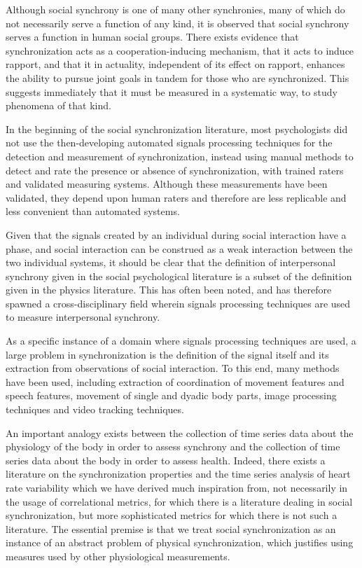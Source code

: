\documentclass[12pt]{article}
\begin{document}
Although social synchrony is one of many other synchronies, many of which do not necessarily serve a function of any kind, it is observed that social synchrony serves a function in human social groups. There exists evidence that synchronization acts as a cooperation-inducing mechanism\cite{coop}, that it acts to induce rapport\cite{rapport}, and that it in actuality, independent of its effect on rapport, enhances the ability to pursue joint goals in tandem for those who are synchronized\cite{goals}. This suggests immediately that it must be measured in a systematic way, to study phenomena of that kind.

In the beginning of the social synchronization literature, most psychologists did not use the then-developing automated signals processing techniques for the detection and measurement of synchronization, instead using manual methods to detect and rate the presence or absence of synchronization, with trained raters and validated measuring systems\cite{manual}. Although these measurements have been validated\cite{manualval}, they depend upon human raters and therefore are less replicable and less convenient than automated systems.

Given that the signals created by an individual during social interaction have a phase, and social interaction can be construed as a weak interaction between the two individual systems, it should be clear that the definition of interpersonal synchrony given in the social psychological literature is a subset of the definition given in the physics literature. This has often been noted\cite{socialsync}, and has therefore spawned a cross-disciplinary field wherein signals processing techniques are used to measure interpersonal synchrony.

As a specific instance of a domain where signals processing techniques are used, a large problem in synchronization is the definition of the signal itself and its extraction from observations of social interaction. To this end, many methods have been used, including extraction of coordination of movement features and speech features\cite{movementfeatures}, movement of single and dyadic body parts\cite{movementparts}, image processing techniques\cite{imageprocessing} and video tracking techniques\cite{videotracking}.

An important analogy exists between the collection of time series data about the physiology of the body in order to assess synchrony and the collection of time series data about the body in order to assess health. Indeed, there exists a literature on the synchronization properties and the time series analysis of heart rate variability which we have derived much inspiration from, not necessarily in the usage of correlational metrics, for which there is a literature dealing in social synchronization, but more sophisticated metrics for which there is not such a literature\cite{hrv1}\cite{hrv2}. The essential premise is that we treat social synchronization as an instance of an abstract problem of physical synchronization, which justifies using measures used by other physiological measurements.
\end{document}
